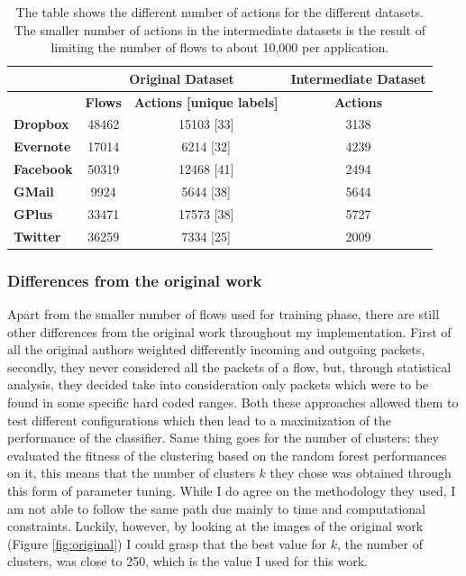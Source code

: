 \begin{table}[!h]
\centering
\begin{tabular}{|l|c|c|c|}
\hline
      & \multicolumn{2}{c|}{Original Dataset} & Intermediate Dataset \\ \hline
         & \textbf{Flows}    & \textbf{Actions [unique labels]}    & \textbf{Actions}              \\ \hline
\textbf{Dropbox}  & 48462    & 15103 [33]                 & 3138                 \\ \hline
\textbf{Evernote} & 17014    & 6214 [32]                  & 4239                 \\ \hline
\textbf{Facebook} & 50319    & 12468 [41]                 & 2494                 \\ \hline
\textbf{GMail}    & 9924     & 5644 [38]                  & 5644                 \\ \hline
\textbf{GPlus}    & 33471    & 17573 [38]                 & 5727                 \\ \hline
\textbf{Twitter}  & 36259    & 7334 [25]                  & 2009                 \\ \hline
\end{tabular}
\caption{\small{The table shows the different number of actions for the different datasets. The smaller number of actions in the intermediate datasets is the result of limiting the number of flows to about 10,000 per application.}}
\label{tab:datasetdata}
\end{table}


\subsubsection{Differences from the original work}
Apart from the smaller number of flows used for training phase, there are still other differences from the original work throughout my implementation. First of all the original authors weighted differently incoming and outgoing packets, secondly, they never considered all the packets of a flow, but, through statistical analysis, they decided take into consideration only packets which were to be found in some specific hard coded ranges. Both these approaches allowed them to test different configurations which then lead to a maximization of the performance of the classifier. Same thing goes for the number of clusters: they evaluated the fitness of the clustering based on the random forest performances on it, this means that the number of clusters $k$ they chose was obtained through this form of parameter tuning. While I do agree on the methodology they used, I am not able to follow the same path due mainly to time and computational constraints. Luckily, however, by looking at the images of the original work (Figure \ref{fig:original}) I could grasp that the best value for $k$, the number of clusters, was close to 250, which is the value I used for this work.  

